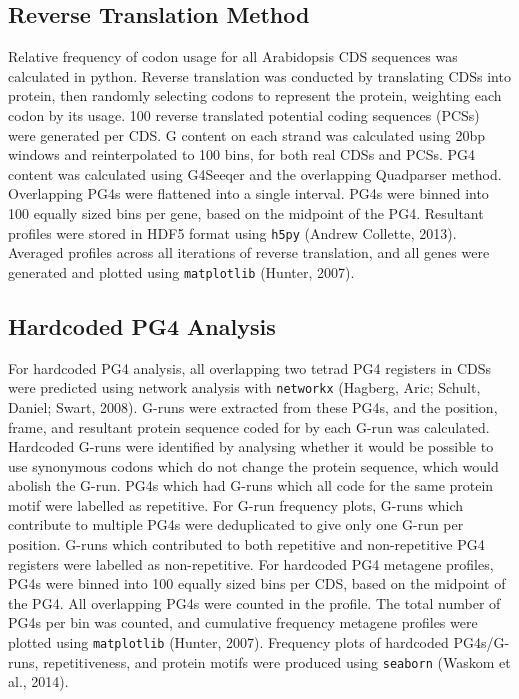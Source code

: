 \documentclass[12pt,a4paper,]{report}
\begin{document}
\hypertarget{reverse-translation-method}{%
\subsection{Reverse Translation
Method}\label{reverse-translation-method}}

Relative frequency of codon usage for all Arabidopsis CDS sequences was
calculated in python. Reverse translation was conducted by translating
CDSs into protein, then randomly selecting codons to represent the
protein, weighting each codon by its usage. 100 reverse translated
potential coding sequences (PCSs) were generated per CDS. G content on
each strand was calculated using 20bp windows and reinterpolated to 100
bins, for both real CDSs and PCSs. PG4 content was calculated using
G4Seeqer and the overlapping Quadparser method. Overlapping PG4s were
flattened into a single interval. PG4s were binned into 100 equally
sized bins per gene, based on the midpoint of the PG4. Resultant
profiles were stored in HDF5 format using \texttt{h5py} (Andrew
Collette, 2013). Averaged profiles across all iterations of reverse
translation, and all genes were generated and plotted using
\texttt{matplotlib} (Hunter, 2007).

\hypertarget{hardcoded-pg4-analysis}{%
\subsection{Hardcoded PG4 Analysis}\label{hardcoded-pg4-analysis}}

For hardcoded PG4 analysis, all overlapping two tetrad PG4 registers in
CDSs were predicted using network analysis with \texttt{networkx}
(Hagberg, Aric; Schult, Daniel; Swart, 2008). G-runs were extracted from
these PG4s, and the position, frame, and resultant protein sequence
coded for by each G-run was calculated. Hardcoded G-runs were identified
by analysing whether it would be possible to use synonymous codons which
do not change the protein sequence, which would abolish the G-run. PG4s
which had G-runs which all code for the same protein motif were labelled
as repetitive. For G-run frequency plots, G-runs which contribute to
multiple PG4s were deduplicated to give only one G-run per position.
G-runs which contributed to both repetitive and non-repetitive PG4
registers were labelled as non-repetitive. For hardcoded PG4 metagene
profiles, PG4s were binned into 100 equally sized bins per CDS, based on
the midpoint of the PG4. All overlapping PG4s were counted in the
profile. The total number of PG4s per bin was counted, and cumulative
frequency metagene profiles were plotted using \texttt{matplotlib}
(Hunter, 2007). Frequency plots of hardcoded PG4s/G-runs,
repetitiveness, and protein motifs were produced using \texttt{seaborn}
(Waskom et al., 2014).
\end{document}

